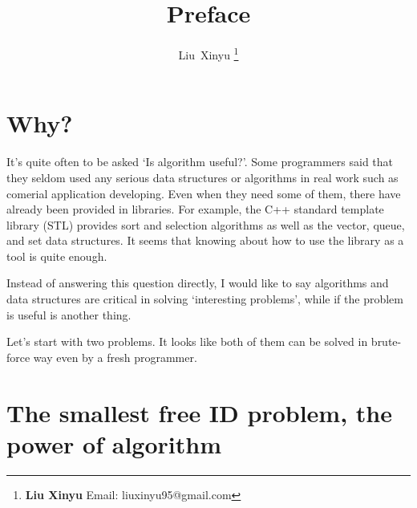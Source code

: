 \documentclass{article}
\begin{document}
\fi


\title{Preface}

\author{Liu~Xinyu
\thanks{{\bfseries Liu Xinyu } \newline
  Email: liuxinyu95@gmail.com \newline}
  }


\maketitle

\section{Why?}
\label{why}

It's quite often to be asked `Is algorithm useful?'. Some programmers
said that they seldom used any serious data structures or algorithms
in real work such as comerial application developing. Even when they need
some of them, there have already been provided in libraries. For example,
the C++ standard template library (STL) provides sort and selection
algorithms as well as the vector, queue, and set data structures.
It seems that knowing about how to use the library as a tool is quite 
enough.

Instead of answering this question directly, I would like to
say algorithms and data structures are critical in solving `interesting
problems', while if the problem is useful is another thing.

Let's start with two problems. It looks like both of them can be 
solved in brute-force way even by a fresh programmer.

\section{The smallest free ID problem, the power of algorithm}
\label{min-free}
\end{document}
